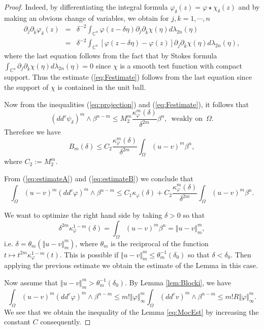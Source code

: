 \documentclass[12pt]{amsart}
\theoremstyle{definition}
\numberwithin{theorem}{section}
\numberwithin{equation}{section}
\newcommand{\C}{\mathbb{C}}
\begin{document}
{\begin{proof}
Indeed, by differentiating the integral formula $
\varphi_\delta (z) = \varphi \star \chi_\delta (z)$
and by making an obvious change of variables, we obtain for $j, k = 1, \cdots, n$
\begin{eqnarray*}
\partial_j \partial_{\bar{k}} \varphi_{\delta}  (z)
&=&  \delta^{-2} \int_{\C^n}  \varphi (z - \delta \eta)  \partial_j \partial_{\bar{k}} \chi   (\eta) d \lambda_{2 n} (\eta) \\
&=& \delta^{-2} \int_{\C^n}  [\varphi (z - \delta \eta)  - \varphi (z)] \partial_j \partial_{\bar{k}} \chi   (\eta) d \lambda_{2 n} (\eta),
\end{eqnarray*}
where the last equation follows from the fact that by Stokes formula $\int_{\C^n} \partial_j \partial_{\bar{k}} \chi   (\eta) d \lambda_{2 n} (\eta) = 0$ since $\chi$ is a smooth test function with compact support.
Thus the estimate (\ref{eq:Festimate}) follows from the last equation since the support of $\chi$ is contained in the unit ball.

 Now from the inequalities (\ref{eq:projection}) and (\ref{eq:Festimate}), it follows that
 $$
 (dd^c \psi_\delta)^m \wedge \beta^{n-m} \leq  M_2^m \frac{\kappa_\varphi^m (\delta)}{\delta^{2 m}} \beta^n,  \, \, \,  \text{weakly  on} \, \, \,  \Omega.
 $$
 Therefore we have
\begin{equation} \label{eq:estimateB}
B_m (\delta) \leq C_2 \frac{\kappa_\varphi^m (\delta)}{\delta^{2 m}} \int_{\Omega} (u - v)^m \beta^n,
\end{equation}
where $C_2 := M_2^m$.

From (\ref{eq:estimateA}) and (\ref{eq:estimateB}) we conclude that
$$
\int_{\Omega} (u - v)^m  (dd^c\varphi)^m\wedge\beta^{n-m} \leq  C_1 \kappa_\varphi  (\delta) +   C_2 \frac{\kappa^m_\varphi (\delta)}{\delta^{2 m}} \int_{\Omega} (u - v)^m \beta^n.
$$

We want to optimize the right hand side by taking $\delta> 0$ so that 
$$
 \delta^{2 m} \kappa^{1-m}_\varphi (\delta) = \int_{\Omega} (u - v)^m \beta^n = \Vert u-v\Vert_m^m,
$$
i.e.  $\delta = \theta_m (\Vert u-v\Vert_m^m)$, where $\theta_m$ is the reciprocal of the function $t \longmapsto t^{2m} \kappa_\varphi^{1-m} (t)$. This is possible if  $\Vert u - v \Vert_{m}^m \leq \theta_m^{-1} (\delta_0)$ so that  $\delta < \delta_0$. Then applying the previous estimate we obtain the  estimate of the Lemma in this case.

Now assume that $\Vert u - v \Vert_{m}^m >  \theta_m^{-1} (\delta_0)$.  By Lemma \ref{lem:Blocki}, we have
$$
\int_{\Omega}(u-v)^m (dd^c\varphi)^m\wedge\beta^{n-m}\leq m! \Vert \varphi \Vert_{\infty}^m \int_\Omega  (dd^cv)^m\wedge\beta^{n-m} \leq  m!  R \Vert \varphi \Vert_{\infty}^m.
$$
We see that we obtain the inequality of the Lemma \ref{eq:MocEst} by increasing the constant $ C$ consequently.
\end{proof}

}
\end{document}

